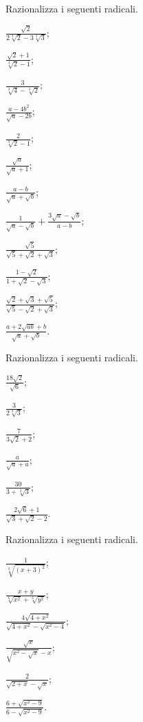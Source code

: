 \begin{esercizio}[\Ast]
 \label{ese:2.92}
Razionalizza i seguenti radicali.
 \begin{multicols}{3}
 \begin{enumeratea}
 \item $\frac{\sqrt 2}{2\sqrt[3]2-3\sqrt[3]3}$;
 \item $\frac{\sqrt 2+1}{\sqrt[3]2-1}$;
 \item $\frac 3{\sqrt[3]4-\sqrt[3]2}$;
 \item $\frac{a-4b^2}{\sqrt a-2b}$;
 \item $\frac 2{\sqrt[3]2-1}$;
 \item $\frac{\sqrt a}{\sqrt a+1}$;
 \item $\frac{a-b}{\sqrt a+\sqrt b}$;
 \item $\frac 1{\sqrt a-\sqrt b}+\frac{3\sqrt a-\sqrt b}{a-b}$;
 \item $\frac{\sqrt 5}{\sqrt 5+\sqrt 2+\sqrt 3}$;
 \item $\frac{1-\sqrt 2}{1+\sqrt 2-\sqrt 3}$;
 \item $\frac{\sqrt 2+\sqrt 3+\sqrt 5}{\sqrt 5-\sqrt 2+\sqrt 3}$;
 \item $\frac{a+2\sqrt{\mathit{ab}}+b}{\sqrt a+\sqrt b}$.
 \end{enumeratea}
 \end{multicols}
\end{esercizio}
\pagebreak
\begin{esercizio}[\Ast]
 \label{ese:2.93}
Razionalizza i seguenti radicali.
 \begin{multicols}{3}
 \begin{enumeratea}
 \item $\frac{18\sqrt{2}}{\sqrt{6}}$;
 \item $\frac{3}{2\sqrt[3]{3}}$;
 \item $\frac{7}{3\sqrt{2}+2}$;
 \item $\frac{a}{\sqrt{a}+a}$;
 \item $\frac{30}{3+\sqrt[3]{3}}$;
 \item $\frac{2\sqrt{6}+1}{\sqrt{3}+\sqrt{2}-2}$.
 \end{enumeratea}
 \end{multicols}
\end{esercizio}

\begin{esercizio}[\Ast]
 \label{ese:2.94}
Razionalizza i seguenti radicali.
 \begin{multicols}{3}
 \begin{enumeratea}
 \item $\frac{1}{\sqrt[3]{(x+3)^{2}}}$;
 \item $\frac{x+y}{\sqrt[6]{x^{2}}+\sqrt[6]{y^{2}}}$;
 \item $\frac{4\sqrt{4+x^{2}}}{\sqrt{4+x^{2}}-\sqrt{x^{2}-4}}$;
 \item $\frac{\sqrt{x}}{\sqrt{x^{2}-\sqrt{x}}-x}$;
 \item $\frac{2}{\sqrt{2+x}-\sqrt{x}}$;
 \item $\frac{6+\sqrt{x^{2}-9}}{6-\sqrt{x^{2}-9}}$.
 \end{enumeratea}
 \end{multicols}
\end{esercizio}

